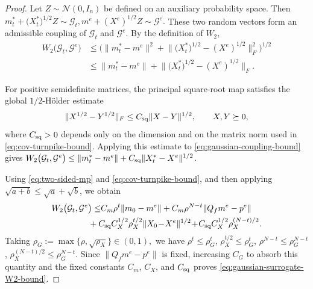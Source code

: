 \documentclass[10pt,journal,twoside]{IEEEtran}
\theoremstyle{definition}
\theoremstyle{remark}
\begin{document}
\begin{proof}
Let \(Z\sim\mathcal N(0,I_n)\) be defined on an auxiliary
			probability space. Then
	\(
	m_t^*
	+
	\big(X_t^*\big)^{1/2}Z
	\sim
	\mathcal G_t,
	m^e+(X^e)^{1/2}Z
	\sim
	\mathcal G^e .
	\)
    These two random vectors form an admissible coupling of \(\mathcal G_t\) and \(\mathcal G^e\). By the definition of \(W_2\),
		\begin{align}
			W_2\big(\mathcal G_t,\mathcal G^e\big)
			&\le
			\Bigg(
			\|m_t^*-m^e\|^2 \!+\!
			\Big\|
			\big(X_t^*\big)^{1/2}
			\!\!-\!
			(X^e)^{1/2}
			\Big\|_F^2
			\Bigg)^{1/2}                                     \nonumber \\
			&\le
			\|m_t^*-m^e\| +
			\Big\|
			\big(X_t^*\big)^{1/2}
			-
			(X^e)^{1/2}
			\Big\|_F .\label{eq:gaussian-coupling-bound}
		\end{align}
		

	

	For positive semidefinite matrices, the
			principal square-root map satisfies the global \(1/2\)-H\"older
			estimate
	\begin{equation*}
		\|X^{1/2}-Y^{1/2}\|_F
		\le
		C_{\rm sq}\|X-Y\|^{1/2},
		\qquad
		X,Y\succeq0,
	\end{equation*}
	where \(C_{\rm sq}>0\) depends only on the dimension and on the matrix norm used in \eqref{eq:cov-turnpike-bound}. Applying this estimate to \eqref{eq:gaussian-coupling-bound}
	gives $W_2\big(\mathcal G_t,\mathcal G^e\big)
		\le
		\|m_t^*-m^e\| +
		C_{\rm sq}
		\|X_t^*-X^e\|^{1/2}$.
	
	Using \eqref{eq:two-sided-mp} and \eqref{eq:cov-turnpike-bound}, and then applying \(\sqrt{a+b}\le\sqrt a+\sqrt b\), we obtain
	\[
	\begin{aligned}
		W_2\big(\mathcal G_t,\mathcal G^e\big)
		\le&
		C_m\rho^t\|m_0-m^e\|+
		C_m\rho^{N-t}\|Q_fm^e-p^e\| \\
		&\!\!\!\!\!\!\!\!\!+
		C_{\rm sq}C_X^{1/2}
		\rho_X^{t/2}
		\|X_0\!-\!X^e\|^{1/2} \!+\!
		C_{\rm sq}C_X^{1/2}
		\rho_X^{(N-t)/2}.
	\end{aligned}
	\]
	Taking
	\(
	\rho_G
	:=
	\max\{\rho,\sqrt{\rho_X}\}
	\in(0,1),
	\)
	we have
	$\rho^t\le\rho_G^t$,
	$\rho_X^{t/2}\le\rho_G^t$,
	$\rho^{N-t}\le\rho_G^{N-t}$,
	$\rho_X^{(N-t)/2}\le\rho_G^{N-t}$.
	Since
			\(\|Q_fm^e-p^e\|\) is fixed, increasing \(C_G\) to absorb this
			quantity and the fixed constants \(C_m\), \(C_X\), and
			\(C_{\rm sq}\) proves \eqref{eq:gaussian-surrogate-W2-bound}.
\end{proof}
\end{document}
